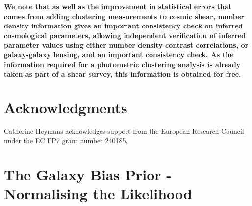 \documentclass[useAMS,usenatbib,times,letter,amssymb]{mn2e}
\begin{document}
{\bf We note that as well as the improvement in statistical errors that comes from adding clustering measurements to cosmic shear, number density information gives an important consistency check on inferred cosmological parameters, allowing independent verification of inferred parameter values using either number density contrast correlations, or galaxy-galaxy lensing, and an important consistency check. As the information required for a photometric clustering analysis is already taken as part of a shear survey, this information is obtained for free.}





\section*{Acknowledgments}

Catherine Heymans acknowledges support from the European Research Council under the EC FP7 grant number 240185.




\appendix

\section[]{The Galaxy Bias Prior - Normalising the Likelihood}\label{App:NormalisingGBP}
\end{document}
